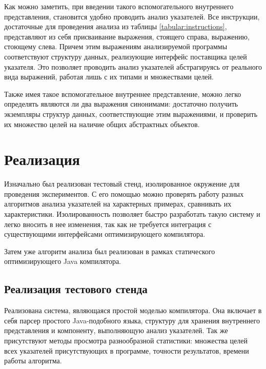 \documentclass[14pt,titlepage]{extarticle}
\let\oldsection\section
\renewcommand{\section}{\newpage\oldsection}
\begin{document}
    Как можно заметить, при введении такого вспомогательного внутреннего
    представления, становится удобно проводить анализ указателей.
    Все инструкции, достаточные для проведения анализа из таблицы
    \ref{tabular:instructions}, представляют из себя присваивание выражения,
    стоящего справа, выражению, стоющему слева. Причем этим выражениям
    анализируемой программы соответствуют структуру данных, реализующие интерфейс
    поставщика целей указателя. Это позволяет проводить анализ указателей
    абстрагируясь от реального вида выражений, работая лишь с их типами и
    множествами целей.

    Также имея такое вспомогательное внутреннее представление, можно легко
    определять являются ли два выражения синонимами: достаточно получить
    экземпляры структур данных, соответствующие этим выражениями, и проверить
    их множество целей на наличие общих абстрактных объектов.


  \section{Реализация}

    Изначально был реализован тестовый стенд, изолированное окружение для
    проведения экспериментов. С его помощью можно проверять работу
    разных алгоритмов анализа указателей на характерных примерах, сравнивать их
    характеристики. Изолированность позволяет быстро разработать такую систему
    и легко вносить в нее изменения, так как не требуется интеграция с
    существующими интерфейсами оптимизирующего компилятора.

    Затем уже алгоритм анализа был реализован в рамках статического
    оптимизирующего Java компилятора.

    \subsection{Реализация тестового стенда}

      Реализована система, являющаяся простой моделью компилятора. Она включает
      в себя парсер простого Java-подобного языка, структуру для хранения
      внутреннего представления и компоненту, выполняющую анализ указателей.
      Так же присутствуют методы просмотра разнообразной статистики: множества
      целей всех указателей присутствующих в программе, точности результатов,
      времени работы алгоритма.
\end{document}
